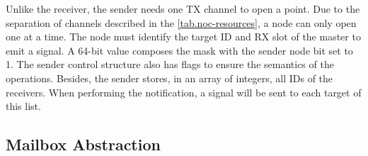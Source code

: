 
				Unlike the receiver, the sender needs one \cnoc TX channel to open a \sync point. Due to the separation of channels described in the \autoref{tab.noc-resources}, a node can only open one \sync at a time. The node must identify the target ID and RX slot of the master to emit a signal. A 64-bit value composes the mask with the sender node bit set to 1. The sender control structure also has flags to ensure the semantics of the operations. Besides, the sender stores, in an array of integers, all IDs of the receivers. When performing the notification, a signal will be sent to each target of this list.

		\subsection{Mailbox Abstraction}
		\label{sec.mailbox-abs}



